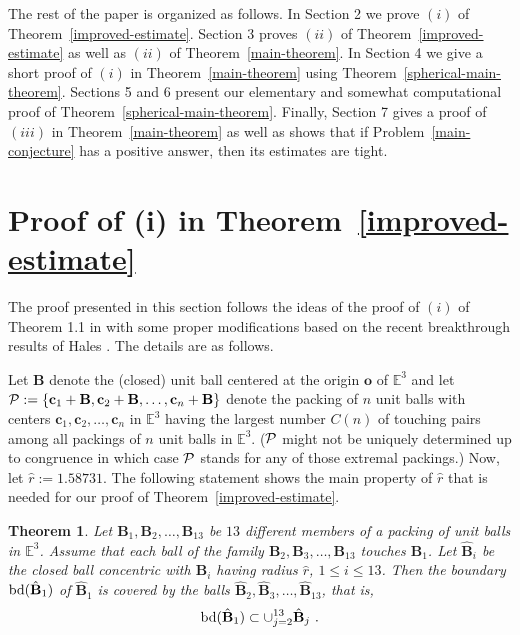\documentclass[10pt]{article}
\newtheorem{Theorem}{Theorem}
\numberwithin{Subcase}{Case}
\begin{document}
The rest of the paper is organized as follows. In Section 2 we prove $(i)$ of  Theorem~\ref{improved-estimate}. Section 3 proves $(ii)$ of Theorem~\ref{improved-estimate} as well as $(ii)$ of 
Theorem~\ref{main-theorem}.  In Section 4 we give a short proof of $(i)$ in Theorem~\ref{main-theorem} using Theorem~\ref{spherical-main-theorem}. Sections 5 and 6 present our elementary and somewhat computational proof of Theorem~\ref{spherical-main-theorem}. Finally, Section 7 gives a proof of $(iii)$ in Theorem~\ref{main-theorem} as well as shows that if Problem~\ref{main-conjecture} has a positive answer, then its estimates are tight.

\section{Proof of (i) in Theorem~\ref{improved-estimate}}

The proof presented in this section follows the ideas of the proof of $(i)$ of Theorem 1.1 in \cite{B12} with some proper modifications based on the recent breakthrough results of Hales \cite{H11}.
The details are as follows.

Let $\mathbf{B}$ denote the (closed) unit ball centered at the origin $\mathbf{o}$ of $\mathbb{E}^3$ and let ${\cal P}:=\{\mathbf{c}_1+\mathbf{B}, \mathbf{c}_2+\mathbf{B}, \dots , \mathbf{c}_n+\mathbf{B}\} $ denote the packing of $n$ unit balls with centers $\mathbf{c}_1, \mathbf{c}_2, \dots , \mathbf{c}_n$ in $\mathbb{E}^3$ having the largest number $C(n)$ of touching pairs among all packings of $n$ unit balls in $\mathbb{E}^3$. (${\cal P}$ might not be uniquely determined up to congruence in which case ${\cal P}$ stands for any of those extremal packings.) Now, let $\hat{r}:=1.58731$. The following statement shows the main property of $\hat{r}$ that is needed for our proof of Theorem~\ref{improved-estimate}.


\begin{Theorem}\label{Bezdek-Hales-1}
Let $\mathbf{B}_1, \mathbf{B}_2, \dots , \mathbf{B}_{13}$ be $13$ different members of a packing of unit balls in $\mathbb{E}^3$. Assume that each ball of the family $\mathbf{B}_2, \mathbf{B}_3, \dots , \mathbf{B}_{13}$ touches $\mathbf{B}_1$. Let $\hat{\mathbf{B}}_i$ be the closed ball concentric with $\mathbf{B}_i$ having radius $\hat{r}$, $1\le i\le 13$. Then
the boundary ${\rm bd}(\hat{\mathbf{B}}_1)$ of $\hat{\mathbf{B}}_1$ is covered by the balls $\hat{\mathbf{B}}_2, \hat{\mathbf{B}}_3, \dots , \hat{\mathbf{B}}_{13}$, that is,
$${\rm bd}(\hat{\mathbf{B}}_1)\subset \cup_{j=2}^{13}\hat{\mathbf{B}}_j \ .$$
\end{Theorem}
\end{document}
